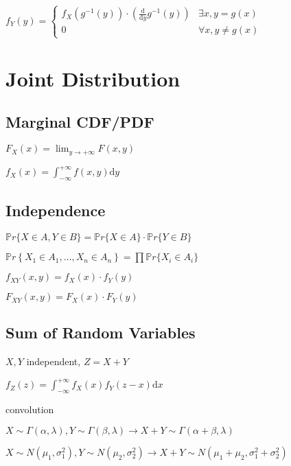 \documentclass[9pt,landscape]{article}
\begin{document}
\begin{multicols}{3}
$f_Y(y)=\begin{cases}
	f_X\left(g^{-1}(y)\right)\cdot\left(\frac{\mathrm{d}}{\mathrm{d}y}g^{-1}(y)\right) & \exists x, y=g(x)\\
	0 & \forall x, y\neq g(x)
\end{cases}$

\section{Joint Distribution}

\subsection{Marginal CDF/PDF}
$F_X(x)=\lim_{y\to +\infty}F(x, y)$

$f_X(x)=\int_{-\infty}^{+\infty}f(x, y)\mathrm{d}y$

\subsection{Independence}

$\mathbb{P}r\{X\in A, Y\in B\}=\mathbb{P}r\{X\in A\}\cdot\mathbb{P}r\{Y\in B\}$

$\mathbb{P}r\left\{X_1 \in A_1, \ldots, X_n \in A_n\right\} = \prod \mathbb{P}r\{X_i \in A_i\}$

$f_{XY}(x, y)=f_X(x)\cdot f_Y(y)$

$F_{XY}(x, y)=F_X(x)\cdot F_Y(y)$

\subsection{Sum of Random Variables}

$X, Y$ independent, $Z=X+Y$

$f_Z(z)=\int_{-\infty}^{+\infty}f_X(x)f_Y(z-x)\mathrm{d}x$

convolution

$X\sim \Gamma(\alpha, \lambda), Y\sim \Gamma(\beta, \lambda)\to X+Y\sim\Gamma(\alpha+\beta, \lambda)$

$X\sim N(\mu_1,\sigma_1^2), Y\sim N(\mu_2,\sigma_2^2)\to X+Y\sim N(\mu_1+\mu_2,\sigma_1^2+\sigma_2^2)$


\end{multicols}
\end{document}
